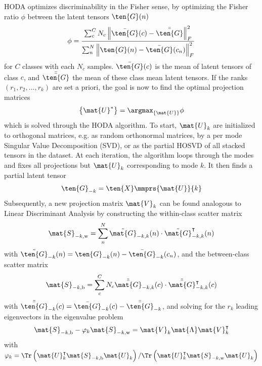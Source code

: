 HODA optimizes discriminability in the Fisher sense, by optimizing the
Fisher ratio $\phi$ between the latent tensors $\ten{G}(n)$
\begin{equation}
	\phi = \frac{\sum_c^CN_c\left\lVert\bar{\ten{G}}(c)-\bar{\bar{\ten{G}}}\right\rVert_F^2}
	{\sum_n^N\left\lVert\ten{G}(n)-\bar{\ten{G}}(c_n)\right\rVert_F^2}
	\label{eq:fisher}
\end{equation}
for $C$ classes with each $N_c$ samples. $\bar{\ten{G}}(c)$ is the mean of
latent
tensors of class $c$, and $\bar{\bar{\ten{G}}}$ the mean of
these class mean latent tensors.
If the ranks $(r_1,r_2, \ldots,r_k)$ are set a priori, the goal is now to find the optimal projection matrices
\begin{equation}
	\left\{\mat{U}^*\right\} = \argmax_{\{\mat{U}\}}\phi
\end{equation}
which is solved through the HODA algorithm.
To start, $\mat{U}_k$ are initialized to orthogonal matrices, e.g. as random
orthonormal matrices, by a per mode Singular Value Decomposition (SVD),
or as the partial HOSVD of all stacked tensors in the dataset.
At each iteration, the algorithm loops through the modes and fixes all
projections but $\mat{U}_k$ corresponding to mode $k$.
It then finds a partial latent tensor
\begin{equation}
	\ten{G}_{-k}=\ten{X}\mmprs{\mat{U}}{k}
\end{equation}
Subsequently, a new projection matrix $\mat{V}_k$ can be found analogous to Linear
Discriminant Analysis by constructing the within-class scatter matrix
\begin{equation}
	\mat{S}_{-k,\text{w}} = \sum_n^N\tilde{\mat{G}}_{-k,k}(n)\cdot\tilde{\mat{G}}_{-k,k}^\intercal(n)
\end{equation}
with $\tilde{\ten{G}}_{-k}(n) = \ten{G}_{-k}(n) - \bar{\ten{G}}_{-k}(c_n)$,
and the between-class scatter matrix
\begin{equation}
	\mat{S}_{-k,\text{b}} =
	\sum_c^CN_c\tilde{\bar{\mat{G}}}_{-k,k}(c)\cdot\tilde{\bar{\mat{G}}}_{-k,k}^\intercal(c)
\end{equation}
with $\tilde{\bar{\ten{G}}}_{-k}(c) = \bar{\ten{G}}_{-k}(c) - \bar{\bar{\ten{G}}}_{-k}$,
and solving for the $r_k$ leading eigenvectors in the eigenvalue problem
\begin{equation}
	\mat{S}_{-k,\text{b}}-\varphi_k\mat{S}_{-k,\text{w}} =
	\mat{V}_k\mat{\Lambda}\mat{V}_k^\intercal
\end{equation}
with $\varphi_k=\Tr\left(\mat{U}_k^\intercal\mat{S}_{-k,\text{b}}\mat{U}_k\right)/\Tr\left(\mat{U}_k^\intercal\mat{S}_{-k,\text{w}}\mat{U}_k\right)$
